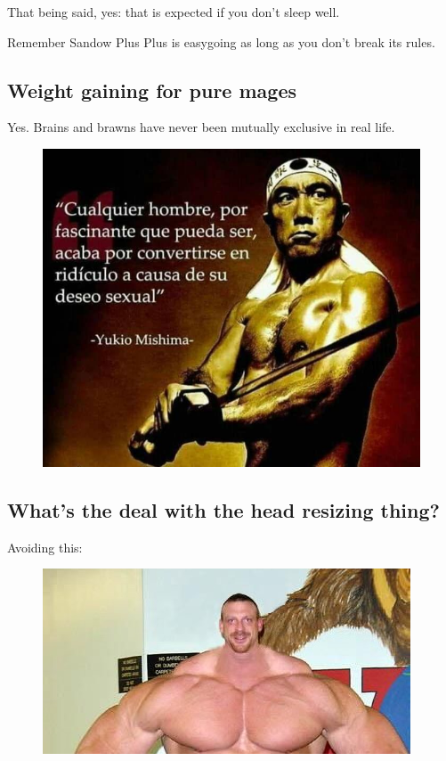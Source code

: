 \documentclass[11pt]{article}
\newlength{\imgMed}
\begin{document}
That being said, yes: that is expected if you don't sleep well. 

Remember Sandow Plus Plus is easygoing as long as you don't break its rules.

\subsection{Weight gaining for pure mages}
Yes. Brains and brawns have never been mutually exclusive in real life.
\begin{figure}[H]
    \centering
    \includegraphics[width=\imgMed]{mishima}
    \label{fig:mishima}
\end{figure}

\subsection{What's the deal with the head resizing thing?}
Avoiding this:

\begin{figure}[H]
    \centering
    \includegraphics[width=\imgMed]{meme-head}
    \label{fig:meme-head}
\end{figure}
\end{document}
